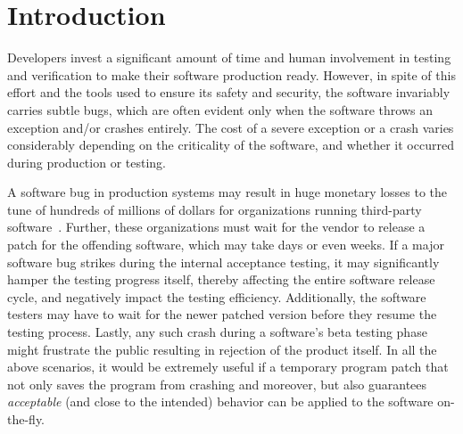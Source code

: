 \section{Introduction}
\label{sec:intro}



Developers invest a significant amount of time and human involvement in testing
and verification to make their software production ready. However, in spite of
this effort and the tools used to ensure its safety and security, the software
invariably carries subtle bugs, which are often evident only when the software
throws an exception and/or crashes entirely. The cost of a severe exception or a
crash varies considerably depending on the criticality of the software, and
whether it occurred during production or testing.


A software bug in production systems may result in huge monetary losses to the
tune of hundreds of millions of dollars for organizations running third-party
software~\cite{hp, amazon, hershey, nike}. Further, these organizations must
wait for the vendor to release a patch for the offending software, which may
take days or even weeks. If a major software bug strikes during the internal 
acceptance testing, it may significantly hamper the testing progress itself,
thereby affecting the entire software release cycle, and negatively impact the
testing efficiency. Additionally, the software testers may have to wait for the
newer patched version before they resume the testing process. Lastly, any such
crash during a software's beta testing phase might frustrate the public
resulting in rejection of the product itself. In all the above scenarios, it
would be extremely useful if a temporary program patch that not only saves the
program from crashing and moreover, but also guarantees \textit{acceptable} (and
close to the intended) behavior can be applied to the software on-the-fly.

